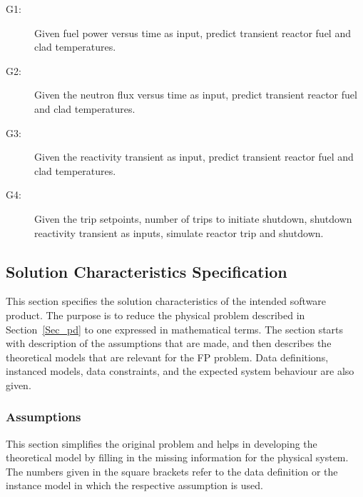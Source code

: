 \begin{description}

\item[G1:] Given fuel power versus time as input, predict transient reactor fuel
  and clad temperatures.

\item[G2:] Given the neutron flux versus time as input, predict transient
  reactor fuel and clad temperatures.

\item[G3:] Given the reactivity transient as input, predict transient reactor
  fuel and clad temperatures.

\item[G4:] Given the trip setpoints, number of trips to initiate shutdown,
  shutdown reactivity transient as inputs, simulate reactor trip and shutdown.
 
\end {description}

\subsection{Solution Characteristics Specification}

This section specifies the solution characteristics of the intended software
product. The purpose is to reduce the physical problem described in
Section~\ref{Sec_pd} to one expressed in mathematical terms. The section starts
with description of the assumptions that are made, and then describes the
theoretical models that are relevant for the FP problem. Data definitions,
instanced models, data constraints, and the expected system behaviour are also
given.

\subsubsection{Assumptions}

This section simplifies the original problem and helps in developing the
theoretical model by filling in the missing information for the physical
system. The numbers given in the square brackets refer to the data definition or
the instance model in which the respective assumption is used.

